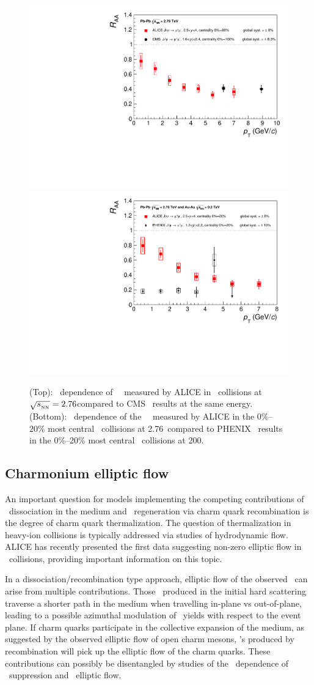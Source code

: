 \begin{figure}[h!]
\begin{center}
\includegraphics[width=0.49\linewidth,keepaspectratio]{qqbarfigures/RAAPtvsModels1.pdf}
\includegraphics[width=0.49\linewidth,keepaspectratio]{qqbarfigures/RAAPtvsModels2.pdf}
\caption{ \label{fig:GR:raaexp2}
(Top): \pT\ dependence of \jpsi\ \Raa\ measured by ALICE in \PbPb\
collisions at $\sqrt{s_{_{\rm NN}}} = 2.76$\TeV compared to CMS~\cite{Chatrchyan:2012np} results at the same energy.
(Bottom): \pT\ dependence of the \jpsi\ \Raa\ measured by ALICE in the 0\%--20\% most
central \PbPb\ collisions at 2.76\TeV\ compared to PHENIX~\cite{Adare:2011yf}
results in the 0\%--20\% most central \AuAu\ collisions at 200\GeV.}
\end{center}
\end{figure}


\subsection{Charmonium elliptic flow}

An important question for models implementing the competing contributions of
\jpsi\ dissociation in the medium and \jpsi\ regeneration via charm quark recombination is
the degree of charm quark thermalization. The question of thermalization in heavy-ion collisions is typically addressed
via studies of hydrodynamic flow. ALICE has recently presented the first data suggesting non-zero elliptic flow
in \PbPb\ collisions, providing important information on this topic.

In a dissociation/recombination type approach, elliptic flow of the observed \jpsi\ can arise from multiple
contributions. Those \jpsi\ produced in the initial hard scattering traverse a shorter path in the medium when
travelling in-plane vs out-of-plane, leading to a possible azimuthal modulation of \jpsi\ yields with respect
to the event plane. If charm quarks participate in the collective expansion of the medium, as
suggested by the observed elliptic flow of open charm mesons, \jpsi's produced by recombination will
pick up the elliptic flow of the charm quarks. These contributions can possibly be disentangled by
studies of the \pT\ dependence of \jpsi\ suppression and \jpsi\ elliptic flow.

